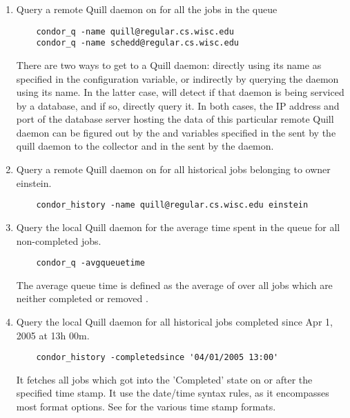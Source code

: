 \begin{enumerate}
\item Query a remote Quill daemon on 
for all the jobs in the queue
\begin{verbatim}
	condor_q -name quill@regular.cs.wisc.edu
	condor_q -name schedd@regular.cs.wisc.edu

\end{verbatim}
There are two ways to get to a Quill daemon: directly using its name as 
specified in the  configuration variable, or indirectly
by querying the  daemon using its name.
In the latter case,  will detect 
if that  daemon is being serviced by a database, and if so, directly query it.
In both cases, the IP address and port of the database server hosting the data of 
this particular remote Quill daemon can be figured out by the  
and  variables specified in the 
sent by the quill daemon to the collector and in the  sent by
the  daemon.  

\item Query a remote Quill daemon on  for all historical 
jobs belonging to owner einstein.
\begin{verbatim}
	condor_history -name quill@regular.cs.wisc.edu einstein
\end{verbatim}

\item Query the local Quill daemon for the average time spent in the queue 
for all non-completed jobs. 
\begin{verbatim}
	condor_q -avgqueuetime 
\end{verbatim}
The average queue time is defined as the average of
 over all jobs which are neither
completed  or removed .

\item Query the local Quill daemon for all historical jobs completed since 
Apr 1, 2005 at 13h 00m.
\begin{verbatim}
	condor_history -completedsince '04/01/2005 13:00'
\end{verbatim}
It fetches all jobs
which got into the 'Completed' state on or after the
specified time stamp.  It use the  date/time
syntax rules, as it encompasses most format options.  See
for the various time stamp formats.

\end{enumerate}

